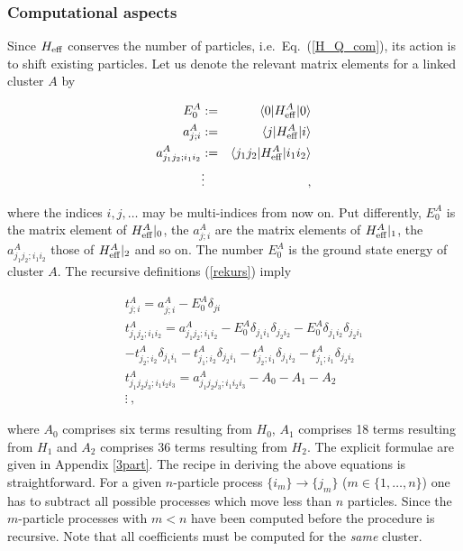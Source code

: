 \subsubsection{Computational aspects}
Since  $H_{\rm eff}$  conserves the number of particles, 
i.e.\ Eq.~(\ref{H_Q_com}), its action
is to shift existing particles. Let us denote
 the relevant matrix elements for a linked 
cluster $A$ by
\begin{mathletters}
\label{a_def}
\begin{eqnarray}
  E_0^A &:=&\langle 0 |H_{\rm eff}^A|0\rangle\\
  a^A_{j;i} &:=& \langle j|H_{\rm eff}^A|i\rangle\\
  a^A_{j_1j_2;i_1i_2} &:=& \langle j_1j_2|H_{\rm eff}^A|i_1i_2\rangle\\
  &\vdots& \nonumber\ ,
\end{eqnarray}
\end{mathletters}
where the indices $i,j,\ldots$ may be multi-indices from now on.
Put differently, $E_0^A$ is the matrix element of $H_{\rm eff}^A|_0$,
the $a^A_{j;i}$ are the matrix elements of $H_{\rm eff}^A|_1$,
 the $a^A_{j_1j_2;i_1i_2}$ 
those of $H_{\rm eff}^A|_2$ and so on. 
The number $E_0^A$ is the ground state energy of cluster $A$. 
The recursive definitions (\ref{rekurs}) imply
\begin{mathletters}
\label{t_def}
\begin{eqnarray}
 && t_{j;i}^A = a_{j;i}^A-E_0^A\delta_{ji}\\
 && t^A_{j_1j_2;i_1i_2} =  a_{j_1j_2;i_1i_2}^A-
E_0^A\delta_{j_1i_1}\delta_{j_2i_2}-E_0^A\delta_{j_1i_2}\delta_{j_2i_1}
\nonumber\\
  && - t^A_{j_2;i_2}\delta_{j_1i_1}- t^A_{j_1;i_2}\delta_{j_2i_1}- 
t^A_{j_2;i_1}\delta_{j_1i_2}- t^A_{j_1;i_1}\delta_{j_2i_2}\\
 && t^A_{j_1j_2j_3;i_1i_2i_3} =  a^A_{j_1j_2j_3;i_1i_2i_3} - A_0 -A_1-A_2\\
  &&\vdots \ , \nonumber
\end{eqnarray}
\end{mathletters}
where $A_0$ comprises six terms resulting from $H_0$, $A_1$ comprises 
18 terms resulting from $H_1$
and $A_2$ comprises 36 terms resulting from $H_2$. The explicit
 formulae are given in Appendix \ref{3part}.
The recipe in deriving the above equations is straightforward. 
For a given $n$-particle process $\{i_m\} \to  \{j_m\}$ ($m\in\{1,\ldots,n\}$)
 one has to subtract all possible processes 
which move less than $n$ particles. Since the $m$-particle processes
with $m<n$ have been computed before the procedure is recursive. 
 Note that all coefficients must be computed for the {\it same} cluster. 

